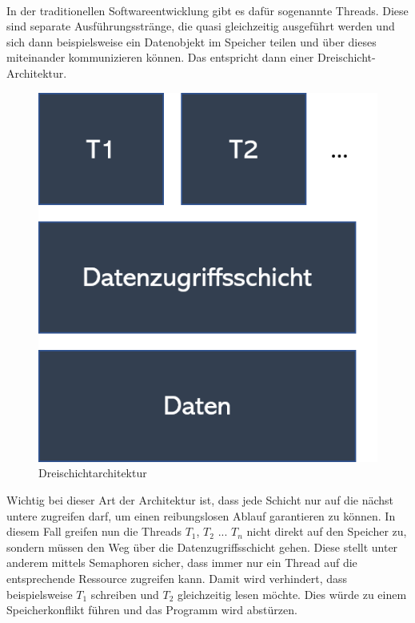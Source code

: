 \paragraph{}
In der traditionellen Softwareentwicklung gibt es dafür sogenannte Threads. Diese sind separate Ausführungsstränge, die quasi gleichzeitig ausgeführt werden und sich dann beispielsweise ein Datenobjekt im Speicher teilen und über dieses miteinander kommunizieren können. Das entspricht dann einer Dreischicht-Architektur.
\begin{figure}[h]
	\centering
	\includegraphics[scale=0.5]{"Grafiken/dreischichtarchitektur.png"}
	\caption{Dreischichtarchitektur}
	\label{fig:meine-grafik}
\end{figure}
Wichtig bei dieser Art der Architektur ist, dass jede Schicht nur auf die nächst untere zugreifen darf, um einen reibungslosen Ablauf garantieren zu können. In diesem Fall greifen nun die Threads $T_1$, $T_2$ ... $T_n$ nicht direkt auf den Speicher zu, sondern müssen den Weg über die Datenzugriffsschicht gehen. Diese stellt unter anderem mittels Semaphoren sicher, dass immer nur ein Thread auf die entsprechende Ressource zugreifen kann. Damit wird verhindert, dass beispielsweise $T_1$ schreiben und $T_2$ gleichzeitig lesen möchte. Dies würde zu einem Speicherkonflikt führen und das Programm wird abstürzen. \cite{riedel2019itarch}

